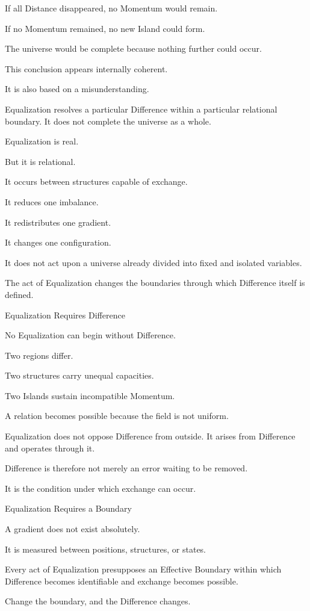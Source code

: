 If all Distance disappeared, no Momentum would remain.

If no Momentum remained, no new Island could form.

The universe would be complete because nothing further could occur.

This conclusion appears internally coherent.

It is also based on a misunderstanding.

Equalization resolves a particular Difference within a particular relational boundary. It does not complete the universe as a whole.

Equalization is real.

But it is relational.

It occurs between structures capable of exchange.

It reduces one imbalance.

It redistributes one gradient.

It changes one configuration.

It does not act upon a universe already divided into fixed and isolated variables.

The act of Equalization changes the boundaries through which Difference itself is defined.

Equalization Requires Difference

No Equalization can begin without Difference.

Two regions differ.

Two structures carry unequal capacities.

Two Islands sustain incompatible Momentum.

A relation becomes possible because the field is not uniform.

Equalization does not oppose Difference from outside. It arises from Difference and operates through it.

Difference is therefore not merely an error waiting to be removed.

It is the condition under which exchange can occur.

Equalization Requires a Boundary

A gradient does not exist absolutely.

It is measured between positions, structures, or states.

Every act of Equalization presupposes an Effective Boundary within which Difference becomes identifiable and exchange becomes possible.

Change the boundary, and the Difference changes.

